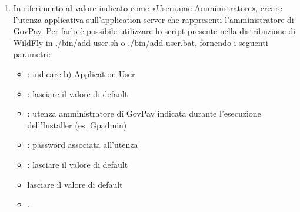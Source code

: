 \documentclass[letterpaper,10pt,italian]{sphinxmanual}
\begin{document}
\begin{enumerate}
\item {} 
In riferimento al valore indicato come «Username
Amministratore», creare l’utenza
applicativa sull’application server che
rappresenti l’amministratore di GovPay. Per farlo è possibile
utilizzare lo script presente nella distribuzione di WildFly
in ./bin/add-user.sh o ./bin/add-user.bat, fornendo i
seguenti parametri:
\begin{itemize}
\item {} 
: indicare b) Application User

\item {} 
: lasciare il valore di default

\item {} 
: utenza amministratore di GovPay indicata durante
l’esecuzione dell’Installer (es. Gpadmin)

\item {} 
: password associata all’utenza

\item {} 
: lasciare il valore di default

\item {} 
 lasciare il valore di default

\item {} 
.

\end{itemize}

\end{enumerate}
\end{document}
